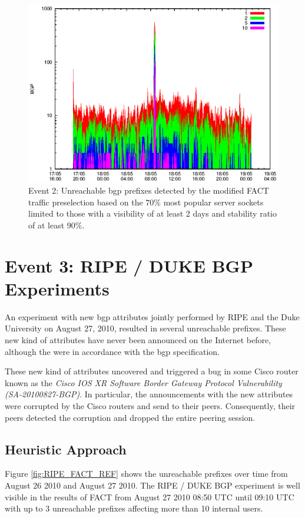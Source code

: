 \begin{figure}
	[p] \centering 
	\includegraphics[width=0.75\linewidth]{images/events/2010_05_18/bgp_log_Set_var_0_1_stab_9_vts_2.eps} \caption{Event 2: Unreachable \gls{bgp} prefixes detected by the modified \gls{FACT} traffic preselection based on the $70\%$ most popular \glspl{server socket} limited to those with a visibility of at least 2 days and stability ratio of at least $90\%$.} 
	\label{fig:TIER1_FACT_popularVTS2STAB9} 
\end{figure}

\newpage 
\section{Event 3: RIPE / DUKE BGP Experiments}

An experiment with new \gls{bgp} attributes jointly performed by RIPE and the 
Duke University on August 27, 2010, resulted in several unreachable 
prefixes\citep{SchatzmannPAM2011}. These new kind of attributes have never been 
announced on the Internet before, although the were in accordance with the 
\gls{bgp} specification\citep{ripe_duke}.

These new kind of attributes uncovered and triggered a bug in some Cisco
router known as the \emph{Cisco IOS XR Software Border Gateway Protocol 
Vulnerability (SA-20100827-BGP)}\citep{cisco_vulnerability}. In particular, the 
announcements with the new attributes were corrupted by the Cisco routers and 
send to their peers. Consequently, their peers detected the corruption and 
dropped the entire peering session\citep{ripe_duke}.

\subsection{Heuristic Approach} 
Figure \ref{fig:RIPE_FACT_REF} shows the unreachable prefixes over time from 
August 26 2010 and August 27 2010. The RIPE / DUKE BGP experiment is well 
visible in the results of  \gls{FACT} from August 27 2010 08:50 UTC until 09:10 
UTC with up to 3 unreachable prefixes affecting more than 10 internal users. 

